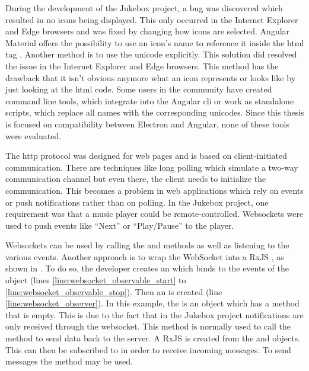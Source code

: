 During the development of the Jukebox project, a bug was discovered which resulted in no icons being displayed. This only occurred in the Internet Explorer and Edge browsers and was fixed by changing how icons are selected. Angular Material offers the possibility to use an icon's name to reference it inside the \gls{html} tag \zB {}. Another method is to use the unicode explicitly. This solution did resolved the issue in the Internet Explorer and Edge browsers. This method has the drawback that it isn't obvious anymore what an icon represents or looks like by just looking at the \gls{html} code. Some users in the community have created command line tools, which integrate into the Angular \gls{cli} or work as standalone scripts, which replace all names with the corresponding unicodes. Since this thesis is focused on compatibility between Electron and Angular, none of these tools were evaluated. \cite{materialIcons}



The \gls{http} protocol was designed for web pages and is based on client-initiated communication. There are techniques like long polling which simulate a two-way communication channel but even there, the client needs to initialize the communication. This becomes a problem in web applications which rely on events or push notifications rather than on polling. In the Jukebox project, one requirement was that a music player could be remote-controlled. Websockets were used to push events like \enquote{Next} or \enquote{Play/Pause} to the player.

Websockets can be used by calling the  and  methods as well as listening to the various events. Another approach is to wrap the WebSocket into a RxJS , as shown in  \cite{rxjs} \cite{js_websockets}. To do so, the developer creates an  which binds to the events of the  object (lines \ref{line:websocket_observable_start} to \ref{line:websocket_observable_stop}). Then an  is created (line \ref{line:websocket_observer}). In this example, the  is an object which has a  method that is empty. This is due to the fact that in the Jukebox project notifications are only received through the websocket. This  method is normally used to call the  method to send data back to the server. A RxJS  is created from the  and  objects. This  can then be subscribed to in order to receive incoming messages. To send messages the  method may be used.

